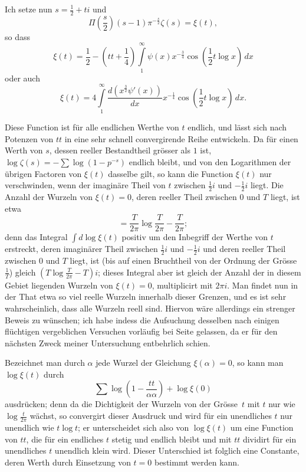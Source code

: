 \documentclass[a4paper,12pt]{article}
\begin{document}
Ich setze nun $s = \frac{1}{2} + ti$ und
\[ \Pi \left( \frac{s}{2} \right) (s - 1) \pi^{-\frac{s}{2}} \zeta(s)
   = \xi(t),\]
so dass
\[ \xi(t) = {\textstyle\frac{1}{2}}
      - (tt + {\textstyle\frac{1}{4}}) \int\limits_1^\infty
         \psi(x) x^{-\frac{3}{4}}
         \cos ({\textstyle\frac{1}{2}}t \log x) \,dx \]
oder auch
\[ \xi(t)
   = 4 \int\limits_1^\infty \frac{d(x^{\frac{3}{2}} \psi'(x))}{dx}
          x^{-\frac{1}{4}} \cos ({\textstyle\frac{1}{2}}t \log x) \,dx.\]

Diese Function ist f\"{u}r alle endlichen Werthe von $t$ endlich, und
l\"{a}sst sich nach Potenzen von $tt$ in eine sehr schnell
convergirende Reihe entwickeln.  Da f\"{u}r einen Werth von $s$,
dessen reeller Bestandtheil gr\"{o}sser als $1$ ist,
$\log \zeta(s) = - \sum \log (1 - p^{-s})$
endlich bleibt, und von den Logarithmen der \"{u}brigen Factoren von
$\xi(t)$ dasselbe gilt, so kann die Function $\xi(t)$ nur
verschwinden, wenn der imagin\"{a}re Theil von $t$ zwischen
$\frac{1}{2} i$ und $-\frac{1}{2} i$ liegt.  Die Anzahl der Wurzeln
von $\xi(t) = 0$, deren reeller Theil zwischen $0$ und $T$ liegt, ist
etwa
\[ = \frac{T}{2\pi} \log \frac{T}{2\pi} - \frac{T}{2\pi};\]
denn das Integral $\int\limits d\log \xi(t)$ positiv um den Inbegriff der
Werthe von $t$ erstreckt, deren imagin\"{a}rer Theil zwischen
$\frac{1}{2} i $ und $-\frac{1}{2}i$ und deren reeller Theil zwischen
$0$ und $T$ liegt, ist (bis auf einen Bruchtheil von der Ordnung der
Gr\"{o}sse
$\displaystyle \frac{1}{T}$) gleich
$\displaystyle \left( T \log \frac{T}{2\pi} - T \right) i$;
dieses Integral aber ist gleich der Anzahl der in diesem Gebiet
liegenden Wurzeln von $\xi(t) = 0$, multiplicirt mit $2\pi i$.  Man
findet nun in der That etwa so viel reelle Wurzeln innerhalb dieser
Grenzen, und es ist sehr wahrscheinlich, dass alle Wurzeln reell sind.
Hiervon w\"{a}re allerdings ein strenger Beweis zu w\"{u}nschen; ich
habe indess die Aufsuchung desselben nach einigen fl\"{u}chtigen
vergeblichen Versuchen vorl\"{a}ufig bei Seite gelassen, da er
f\"{u}r den n\"{a}chsten Zweck meiner Untersuchung entbehrlich schien.

Bezeichnet man durch $\alpha$ jede Wurzel der Gleichung
$\xi(\alpha) = 0$, so kann man $\log \xi(t)$ durch
\[ {\textstyle\sum} \log \left( 1 - \frac{tt}{\alpha \alpha} \right)
      + \log \xi(0) \]
ausdr\"{u}cken; denn da die Dichtigkeit der Wurzeln von der
Gr\"{o}sse~$t$ mit $t$ nur wie
$\displaystyle \log \frac{t}{2\pi}$
w\"{a}chst, so convergirt dieser Ausdruck und wird f\"{u}r ein
unendliches $t$ nur unendlich wie $t \log t$; er unterscheidet sich
also von $\log \xi(t)$ um eine Function von $tt$, die f\"{u}r ein
endliches $t$ stetig und endlich bleibt und mit $tt$ dividirt f\"{u}r
ein unendliches $t$ unendlich klein wird.  Dieser Unterschied ist
folglich eine Constante, deren Werth durch Einsetzung von $t = 0$
bestimmt werden kann.
\end{document}
